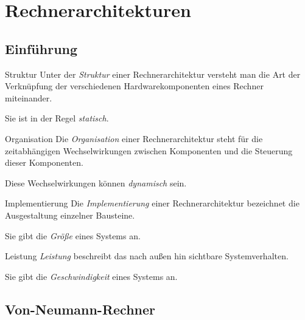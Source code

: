 \section{Rechnerarchitekturen}\label{sec:rechnerarchitekturen}

\subsection{Einführung}\label{subsec:einfuehrung}

\begin{defi}{Struktur}
    Unter der \emph{Struktur} einer Rechnerarchitektur versteht man die Art der Verknüpfung der verschiedenen Hardwarekomponenten eines Rechner miteinander.

    Sie ist in der Regel \emph{statisch}.
\end{defi}

\begin{defi}{Organisation}
    Die \emph{Organisation} einer Rechnerarchitektur steht für die zeitabhängigen Wechselwirkungen zwischen Komponenten und die Steuerung dieser Komponenten.

    Diese Wechselwirkungen können \emph{dynamisch} sein.
\end{defi}

\begin{defi}{Implementierung}
    Die \emph{Implementierung} einer Rechnerarchitektur bezeichnet die Ausgestaltung einzelner Bausteine.

    Sie gibt die \emph{Größe} eines Systems an.
\end{defi}

\begin{defi}{Leistung}
    \emph{Leistung} beschreibt das nach außen hin sichtbare Systemverhalten.

    Sie gibt die \emph{Geschwindigkeit} eines Systems an.
\end{defi}

\subsection{Von-Neumann-Rechner}\label{subsec:von-neumann-rechner}

